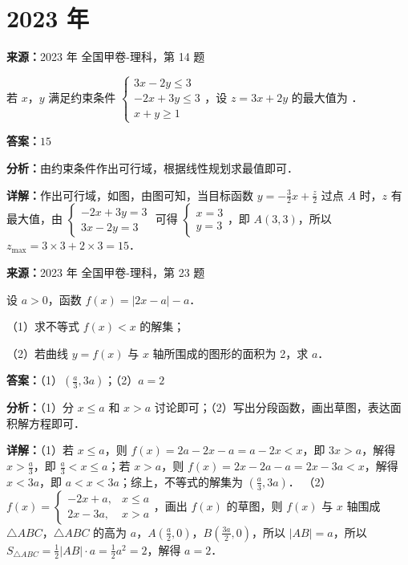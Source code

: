 \section*{2023 年}

\begin{question}[points=5]
\textbf{来源：}2023 年 全国甲卷-理科，第 14 题\par
若 $x$，$y$ 满足约束条件 $\begin{cases} 3x - 2y \le 3 \\ -2x + 3y \le 3 \\ x + y \ge 1 \end{cases}$，设 $z = 3x + 2y$ 的最大值为 ．
\fillin[{$15$}]
\begin{solution}
\textbf{答案：}$15$

\textbf{分析：}由约束条件作出可行域，根据线性规划求最值即可．

\textbf{详解：}作出可行域，如图，由图可知，当目标函数 $y = -\frac{3}{2}x + \frac{z}{2}$ 过点 $A$ 时，$z$ 有最大值，由 $\begin{cases} -2x+3y=3 \\ 3x-2y=3 \end{cases}$ 可得 $\begin{cases} x=3 \\ y=3 \end{cases}$，即 $A(3,3)$，所以 $z_{\max} = 3\times3+2\times3=15$．
\end{solution}
\end{question}

\begin{question}[points=10]
\textbf{来源：}2023 年 全国甲卷-理科，第 23 题\par
设 $a>0$，函数 $f(x) = |2x-a| - a$．

（1）求不等式 $f(x) < x$ 的解集；

（2）若曲线 $y = f(x)$ 与 $x$ 轴所围成的图形的面积为 2，求 $a$．
\begin{solution}
\textbf{答案：}（1）$(\frac{a}{3}, 3a)$；（2）$a=2$

\textbf{分析：}（1）分 $x\le a$ 和 $x>a$ 讨论即可；（2）写出分段函数，画出草图，表达面积解方程即可．

\textbf{详解：}（1）若 $x\le a$，则 $f(x)=2a-2x-a = a-2x < x$，即 $3x > a$，解得 $x > \frac{a}{3}$，即 $\frac{a}{3} < x \le a$；若 $x>a$，则 $f(x)=2x-2a-a = 2x-3a < x$，解得 $x < 3a$，即 $a < x < 3a$；综上，不等式的解集为 $(\frac{a}{3}, 3a)$．
（2）$f(x) = \begin{cases} -2x + a, & x\le a \\ 2x - 3a, & x>a \end{cases}$，画出 $f(x)$ 的草图，则 $f(x)$ 与 $x$ 轴围成 $\triangle ABC$，$\triangle ABC$ 的高为 $a$，$A(\frac{a}{2},0)$，$B(\frac{3a}{2},0)$，所以 $|AB| = a$，所以 $S_{\triangle ABC} = \frac{1}{2}|AB|\cdot a = \frac{1}{2}a^2 = 2$，解得 $a=2$．
\end{solution}
\end{question}

